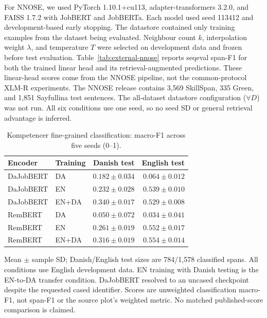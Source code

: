 For NNOSE, we used PyTorch 1.10.1+cu113, adapter-transformers 3.2.0, and FAISS 1.7.2 with JobBERT and JobBERTa. Each model used seed 113412 and development-based early stopping. The datastore contained only training examples from the dataset being evaluated. Neighbour count $k$, interpolation weight $\lambda$, and temperature $T$ were selected on development data and frozen before test evaluation. Table~\ref{tab:external-nnose} reports seqeval span-F1 for both the trained linear head and its retrieval-augmented predictions. These linear-head scores come from the NNOSE pipeline, not the common-protocol XLM-R experiments. The NNOSE release contains 3,569 SkillSpan, 335 Green, and 1,851 Sayfullina test sentences. The all-dataset datastore configuration ($\forall D$) was not run. All six conditions use one seed, so no seed SD or general retrieval advantage is inferred.
\begin{table}[htbp]
\centering\small
\caption{Kompetencer fine-grained classification: macro-F1 across five seeds (0--1).}
\label{tab:external-kompetencer-classification}
\begin{tabularx}{\linewidth}{@{}L P{.18\linewidth}rr@{}}
\toprule
Encoder & Training & Danish test & English test \\
\midrule
DaJobBERT & DA & $0.182\pm0.034$ & $0.064\pm0.012$ \\
DaJobBERT & EN & $0.232\pm0.028$ & $0.539\pm0.010$ \\
DaJobBERT & EN+DA & $0.340\pm0.017$ & $0.529\pm0.008$ \\
RemBERT & DA & $0.050\pm0.072$ & $0.034\pm0.041$ \\
RemBERT & EN & $0.261\pm0.019$ & $0.552\pm0.017$ \\
RemBERT & EN+DA & $0.316\pm0.019$ & $0.554\pm0.014$ \\
\bottomrule
\end{tabularx}
\par\smallskip\RaggedRight\footnotesize Mean $\pm$ sample SD; Danish/English test sizes are 784/1,578 classified spans. All conditions use English development data. EN training with Danish testing is the EN-to-DA transfer condition. DaJobBERT resolved to an uncased checkpoint despite the requested cased identifier. Scores are unweighted classification macro-F1, not span-F1 or the source plot's weighted metric. No matched published-score comparison is claimed.
\end{table}

